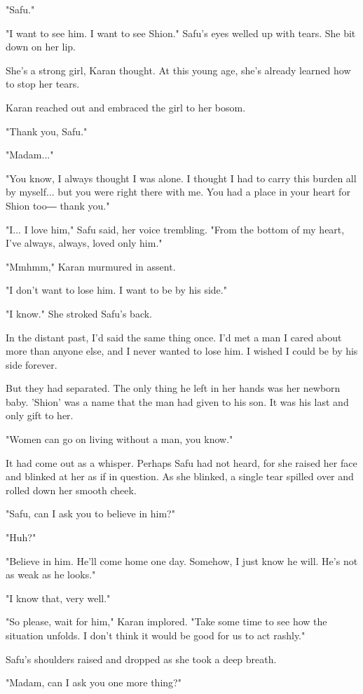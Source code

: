 "Safu."

"I want to see him. I want to see Shion." Safu's eyes welled up with
tears. She bit down on her lip.

She's a strong girl, Karan thought. At this young age, she's already
learned how to stop her tears.

Karan reached out and embraced the girl to her bosom.

"Thank you, Safu."

"Madam..."

"You know, I always thought I was alone. I thought I had to carry this
burden all by myself... but you were right there with me. You had a
place in your heart for Shion too― thank you."

"I... I love him," Safu said, her voice trembling. "From the bottom of
my heart, I've always, always, loved only him."

"Mmhmm," Karan murmured in assent.

"I don't want to lose him. I want to be by his side."

"I know." She stroked Safu's back.

In the distant past, I'd said the same thing once. I'd met a man I cared
about more than anyone else, and I never wanted to lose him. I wished I
could be by his side forever.

But they had separated. The only thing he left in her hands was her
newborn baby. 'Shion' was a name that the man had given to his son. It
was his last and only gift to her.

"Women can go on living without a man, you know."

It had come out as a whisper. Perhaps Safu had not heard, for she raised
her face and blinked at her as if in question. As she blinked, a single
tear spilled over and rolled down her smooth cheek.

"Safu, can I ask you to believe in him?"

"Huh?"

"Believe in him. He'll come home one day. Somehow, I just know he will.
He's not as weak as he looks."

"I know that, very well."

"So please, wait for him," Karan implored. "Take some time to see how
the situation unfolds. I don't think it would be good for us to act
rashly."

Safu's shoulders raised and dropped as she took a deep breath.

"Madam, can I ask you one more thing?"

